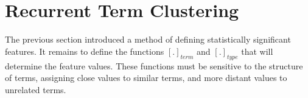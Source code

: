 \section{Recurrent Term Clustering}\label{sec:reclemmaclustering}

The previous section introduced a method of defining statistically significant features. %
It remains to define the functions
 $[.]_{term}$ and $[.]_{type}$ that will determine the feature values.
These functions must be sensitive to the structure of terms, assigning close values 
to similar terms, and more distant values to unrelated terms. %

